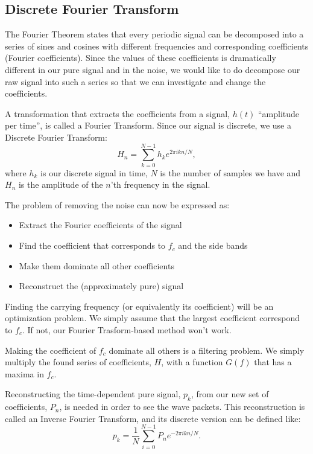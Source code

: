 \documentclass[12pt,a4paper]{article}
\begin{document}
\subsection{Discrete Fourier Transform}
The Fourier Theorem states that every periodic signal can be decomposed into
a series of sines and cosines with different frequencies and corresponding coefficients (Fourier coefficients).
Since the values of these coefficients%
is dramatically different in our pure signal and in the noise,
we would like to do decompose our raw signal into such a series so that we can
investigate and change the coefficients.

A transformation that extracts the coefficients from a signal, $h(t)$ ``amplitude per time'',
is called a Fourier Transform. Since our signal is discrete, we use a Discrete Fourier
Transform:
\begin{equation}\label{eq:ft}
  H_n = \sum_{k=0}^{N-1} h_ke^{2\pi ikn/N},
\end{equation}
where $h_k$ is our discrete signal in time, $N$ is the number of samples we have and
$H_n$ is the amplitude of the $n$'th frequency in the signal.

The problem of removing the noise can now be expressed as:
\begin{itemize}
  \item Extract the Fourier coefficients of the signal
  \item Find the coefficient that corresponds to $f_c$ and the side bands
  \item Make them dominate all other coefficients
  \item Reconstruct the (approximately pure) signal
\end{itemize}

Finding the carrying frequency (or equivalently its coefficient) will be
an optimization problem. We simply assume that the largest coefficient
correspond to $f_c$. If not, our Fourier Trasform-based method won't work.

Making the coefficient of $f_c$ dominate all others is a filtering problem.
We simply multiply the found series of coefficients, $H$, with a function
$G(f)$ that has a maxima in $f_c$.

Reconstructing the time-dependent pure signal, $p_k$,
from our new set of
coefficients, $P_n$, is needed in order to see the wave packets.
This reconstruction is called
an Inverse Fourier Transform, and its discrete version can be defined like:
\begin{equation}\label{eq:ift}
  p_k = \frac1N\sum_{i=0}^{N-1}P_ne^{-2\pi ikn/N}.
\end{equation}
\end{document}
